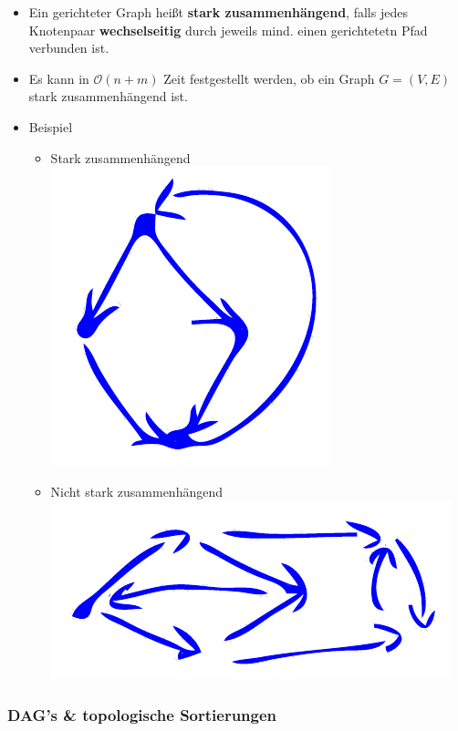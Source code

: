 \documentclass{scrartcl}
\begin{document}
\begin{itemize}
	\item Ein gerichteter Graph heißt \textbf{stark zusammenhängend}, falls jedes Knotenpaar \textbf{wechselseitig} durch jeweils mind. einen gerichtetetn Pfad verbunden ist.
	\item Es kann in $ \mathcal{O}(n+m) $ Zeit festgestellt werden, ob ein Graph $ G = (V,E) $ stark zusammenhängend ist.
	\item Beispiel
	\begin{itemize}
		\item Stark zusammenhängend \\
		\includegraphics{figures/stark-zusammenhaengend.pdf}
		\item Nicht stark zusammenhängend \\
		\includegraphics[width=\linewidth]{figures/nicht-stark-zusammenhaengend.pdf}
	\end{itemize}
\end{itemize}

\subsubsection{DAG's \& topologische Sortierungen}
\end{document}
